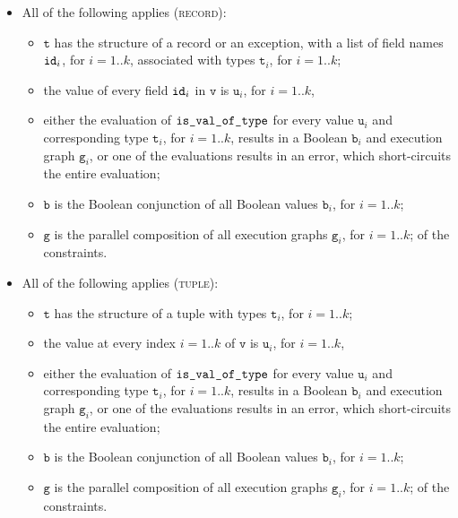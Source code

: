\documentclass{book}
\newcommand\vg[0]{\texttt{g}}
\newcommand\vv[0]{\texttt{v}}
\newcommand\vt[0]{\texttt{t}}
\newcommand\vu[0]{\texttt{u}}
\newcommand\vb[0]{\texttt{b}}
\begin{document}
\begin{itemize}
  \item All of the following applies (\textsc{record}):
  \begin{itemize}
    \item $\vt$ has the structure of a record or an exception, with a list of field names
    $\texttt{id}_i$, for $i=1..k$, associated with types $\vt_i$, for $i=1..k$;
    \item the value of every field $\texttt{id}_i$ in $\vv$ is $\vu_i$, for $i=1..k$,
    \item either the evaluation of $\texttt{is\_val\_of\_type}$ for every value $\vu_i$
    and corresponding type $\vt_i$, for $i=1..k$,
    results in a Boolean $\vb_i$ and execution graph $\vg_i$,
    or one of the evaluations results in an error,
    which short-circuits the entire evaluation;
    \item $\vb$ is the Boolean conjunction of all Boolean values $\vb_i$, for $i=1..k$;
    \item $\vg$ is the parallel composition of all execution graphs $\vg_i$, for $i=1..k$;
    of the constraints.
  \end{itemize}

  \item All of the following applies (\textsc{tuple}):
  \begin{itemize}
    \item $\vt$ has the structure of a tuple with types $\vt_i$, for $i=1..k$;
    \item the value at every index $i=1..k$ of $\vv$ is $\vu_i$, for $i=1..k$,
    \item either the evaluation of $\texttt{is\_val\_of\_type}$ for every value $\vu_i$
    and corresponding type $\vt_i$, for $i=1..k$,
    results in a Boolean $\vb_i$ and execution graph $\vg_i$,
    or one of the evaluations results in an error,
    which short-circuits the entire evaluation;
    \item $\vb$ is the Boolean conjunction of all Boolean values $\vb_i$, for $i=1..k$;
    \item $\vg$ is the parallel composition of all execution graphs $\vg_i$, for $i=1..k$;
    of the constraints.
  \end{itemize}


\end{itemize}
\end{document}
